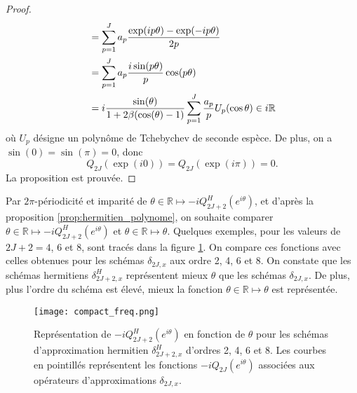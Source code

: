 \begin{proof}
\begin{align*}
	& = \displaystyle\sum\limits_{p=1}^J a_p \dfrac{\exp ( i p \theta ) - \exp ( -i p \theta )}{2 p} \\
	& = \displaystyle\sum\limits_{p=1}^J a_p \dfrac{i \sin (p \theta )}{p} \cos ( p \theta)\\
	& = i \dfrac{\sin(\theta)}{1 +2 \beta (\cos (\theta) -1)} \displaystyle\sum\limits_{p=1}^J \dfrac{a_p}{p} U_p (\cos \theta) \in i \mathbb{R}
\end{align*}
où $U_p$ désigne un polynôme de Tchebychev de seconde espèce.
De plus, on a $\sin (0 ) = \sin (\pi) = 0$, donc 
\begin{equation}
Q_{2J} \left( \exp ( i 0 ) \right) = Q_{2J} \left( \exp ( i \pi ) \right) = 0.
\end{equation}
La proposition est prouvée.
\end{proof}

Par $2 \pi$-périodicité et imparité de $\theta \in \mathbb{R} \mapsto - i Q_{2J+2}^H(e^{i \theta})$, et d'après la proposition \ref{prop:hermitien_polynome}, on souhaite comparer $\theta \in \mathbb{R} \mapsto - i Q_{2J+2}^H(e^{i \theta})$ et $\theta \in \mathbb{R} \mapsto \theta$. Quelques exemples, pour les valeurs de $2J+2 = 4$, $6$ et $8$, sont tracés dans la figure \ref{fig:freq_herm}. On compare ces fonctions avec celles obtenues pour les schémas $\delta_{2J,x}$ aux ordre 2, 4, 6 et 8. On constate que les schémas hermitiens $\delta_{2J+2,x}^H$ représentent mieux $\theta$ que les schémas $\delta_{2J,x}$. De plus, plus l'ordre du schéma est élevé, mieux la fonction $\theta \in \mathbb{R} \mapsto \theta$ est représentée.

\begin{figure}[htbp]
\begin{center}
\texttt{[image: compact\_freq.png]}
\end{center}
\caption{Représentation de $-i Q_{2J+2}^H \left( e^{i \theta} \right)$ en fonction de $\theta$ pour les schémas d'approximation hermitien $\delta_{2J+2,x}^H$ d'ordres 2, 4, 6 et 8. Les courbes en pointillés représentent les fonctions $-i Q_{2J}\left( e^{i \theta} \right)$ associées aux opérateurs d'approximations $\delta_{2J,x}$.}
\label{fig:freq_herm}
\end{figure}


